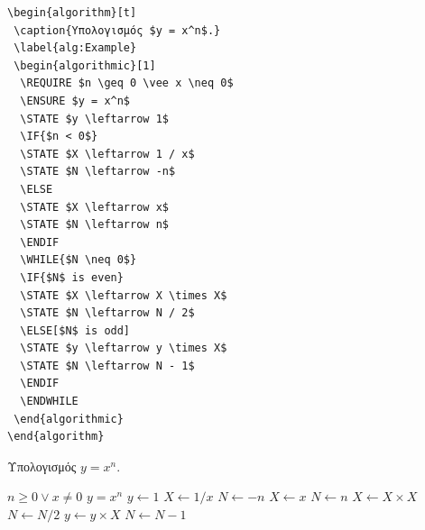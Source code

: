\begin{verbatim}
\begin{algorithm}[t]
 \caption{Υπολογισμός $y = x^n$.}
 \label{alg:Example}
 \begin{algorithmic}[1]
  \REQUIRE $n \geq 0 \vee x \neq 0$
  \ENSURE $y = x^n$
  \STATE $y \leftarrow 1$
  \IF{$n < 0$}
  \STATE $X \leftarrow 1 / x$
  \STATE $N \leftarrow -n$
  \ELSE
  \STATE $X \leftarrow x$
  \STATE $N \leftarrow n$
  \ENDIF
  \WHILE{$N \neq 0$}
  \IF{$N$ is even}
  \STATE $X \leftarrow X \times X$
  \STATE $N \leftarrow N / 2$
  \ELSE[$N$ is odd]
  \STATE $y \leftarrow y \times X$
  \STATE $N \leftarrow N - 1$
  \ENDIF
  \ENDWHILE
 \end{algorithmic}
\end{algorithm}
\end{verbatim}

\begin{algorithm}[t]
	\caption{Υπολογισμός $y = x^n$.}
	\label{alg:Example}
	\begin{algorithmic}[1]
		\REQUIRE $n \geq 0 \vee x \neq 0$
		\ENSURE $y = x^n$
		\STATE $y \leftarrow 1$
		\STATE $X \leftarrow 1 / x$
		\STATE $N \leftarrow -n$
		\ELSE
		\STATE $X \leftarrow x$
		\STATE $N \leftarrow n$
		\ENDIF
		\STATE $X \leftarrow X \times X$
		\STATE $N \leftarrow N / 2$
		\ELSE[$N$ is odd]
		\STATE $y \leftarrow y \times X$
		\STATE $N \leftarrow N - 1$
		\ENDIF
		\ENDWHILE
	\end{algorithmic}
\end{algorithm}


